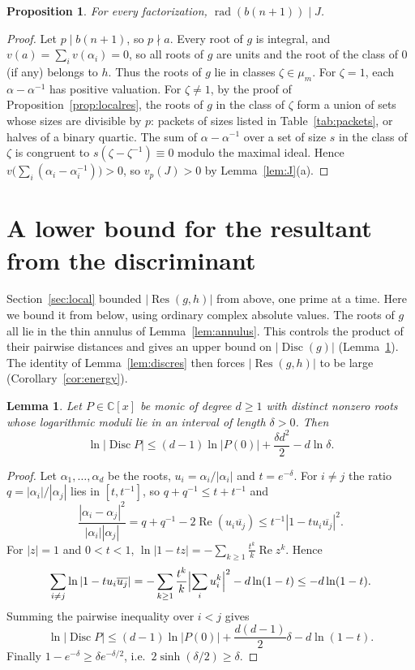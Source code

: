 \documentclass[11pt]{amsart}
\newtheorem{lemma}[theorem]{Lemma}
\newtheorem{proposition}[theorem]{Proposition}
\theoremstyle{definition}
\theoremstyle{remark}
\numberwithin{equation}{section}
\newcommand{\C}{\mathbb{C}}
\newcommand{\Disc}{\operatorname{Disc}}
\newcommand{\Res}{\operatorname{Res}}
\newcommand{\rad}{\operatorname{rad}}
\begin{document}
\begin{proposition}\label{prop:radJ}
For every factorization, $\rad(b(n+1))\mid J$.
\end{proposition}

\begin{proof}
Let $p\mid b(n+1)$, so $p\nmid a$. Every root of $g$ is integral, and
$v(a)=\sum_iv(\alpha_i)=0$, so all roots of $g$ are units and the root of
the class of $0$ (if any) belongs to $h$. Thus the roots of $g$ lie in
classes $\zeta\in\mu_m$. For $\zeta=1$, each $\alpha-\alpha^{-1}$ has
positive valuation. For $\zeta\ne1$, by the proof of
Proposition~\ref{prop:localres}, the roots of $g$ in the class of $\zeta$
form a union of sets whose sizes are divisible by $p$: packets of sizes
listed in Table~\ref{tab:packets}, or halves of a binary quartic. The sum
of $\alpha-\alpha^{-1}$ over a set of size $s$ in the class of $\zeta$ is
congruent to $s(\zeta-\zeta^{-1})\equiv0$ modulo the maximal ideal. Hence
$v\bigl(\sum_i(\alpha_i-\alpha_i^{-1})\bigr)>0$, so $v_p(J)>0$ by
Lemma~\ref{lem:J}(a).
\end{proof}

\section{A lower bound for the resultant from the discriminant}\label{sec:lower}

Section~\ref{sec:local} bounded $|\Res(g,h)|$ from above, one prime at a
time. Here we bound it from below, using ordinary complex absolute values.
The roots of $g$ all lie in the thin annulus of Lemma~\ref{lem:annulus}.
This controls the product of their pairwise distances and gives an upper
bound on $|\Disc(g)|$ (Lemma~\ref{lem:discbound}). The identity of Lemma~\ref{lem:discres} then
forces $|\Res(g,h)|$ to be large (Corollary~\ref{cor:energy}).

\begin{lemma}\label{lem:discbound}
Let $P\in\C[x]$ be monic of degree $d\ge1$ with distinct nonzero roots
whose logarithmic moduli lie in an interval of length $\delta>0$. Then
\[
 \ln|\Disc P|\le(d-1)\ln|P(0)|+\frac{\delta d^2}2-d\ln\delta .
\]
\end{lemma}

\begin{proof}
Let $\alpha_1,\dots,\alpha_d$ be the roots, $u_i=\alpha_i/|\alpha_i|$ and
$t=e^{-\delta}$. For $i\ne j$ the ratio $q=|\alpha_i|/|\alpha_j|$ lies in
$[t,t^{-1}]$, so $q+q^{-1}\le t+t^{-1}$ and
\[
 \frac{|\alpha_i-\alpha_j|^2}{|\alpha_i||\alpha_j|}
 =q+q^{-1}-2\operatorname{Re}(u_i\overline{u_j})
 \le t^{-1}|1-tu_i\overline{u_j}|^2 .
\]
For $|z|=1$ and $0<t<1$,
$\ln|1-tz|=-\sum_{k\ge1}\frac{t^k}{k}\operatorname{Re}z^k$. Hence
\[
 \sum_{i\ne j}\ln|1-tu_i\overline{u_j}|
 =-\sum_{k\ge1}\frac{t^k}{k}\Bigl|\sum_iu_i^k\Bigr|^2-d\ln(1-t)
 \le-d\ln(1-t).
\]
Summing the pairwise inequality over $i<j$ gives
\[
 \ln|\Disc P|\le(d-1)\ln|P(0)|+\frac{d(d-1)}2\delta-d\ln(1-t).
\]
Finally $1-e^{-\delta}\ge\delta e^{-\delta/2}$, i.e.\
$2\sinh(\delta/2)\ge\delta$.
\end{proof}
\end{document}
